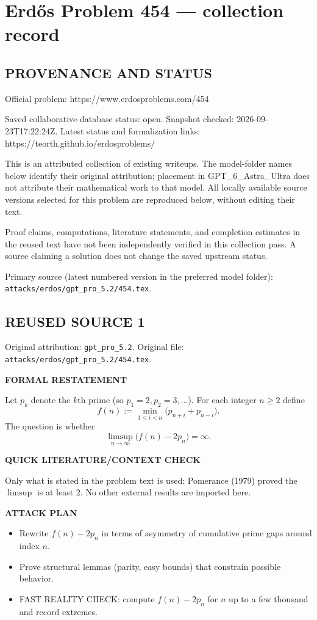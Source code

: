 \section*{Erd\H{o}s Problem 454 --- collection record}

\subsection*{PROVENANCE AND STATUS}
Official problem: https://www.erdosproblems.com/454

Saved collaborative-database status: open.
Snapshot checked: 2026-09-23T17:22:24Z.
Latest status and formalization links: https://teorth.github.io/erdosproblems/

This is an attributed collection of existing writeups. The model-folder names below identify their original attribution; placement in GPT\_6\_Astra\_Ultra does not attribute their mathematical work to that model. All locally available source versions selected for this problem are reproduced below, without editing their text.

Proof claims, computations, literature statements, and completion estimates in the reused text have not been independently verified in this collection pass. A source claiming a solution does not change the saved upstream status.

Primary source (latest numbered version in the preferred model folder): \texttt{attacks/erdos/gpt\_pro\_5.2/454.tex}.

\subsection*{REUSED SOURCE 1}
Original attribution: \texttt{gpt\_pro\_5.2}.
Original file: \texttt{attacks/erdos/gpt\_pro\_5.2/454.tex}.


\textbf{FORMAL RESTATEMENT}

Let $p_k$ denote the $k$th prime (so $p_1=2,p_2=3,\dots$). For each integer $n\ge 2$ define
\[
f(n):=\min_{1\le i<n}\big(p_{n+i}+p_{n-i}\big).
\]
The question is whether
\[
\limsup_{n\to\infty}\big(f(n)-2p_n\big)=\infty.
\]

\textbf{QUICK LITERATURE/CONTEXT CHECK}

Only what is stated in the problem text is used: Pomerance (1979) proved the $\limsup$ is at least $2$.
No other external results are imported here.

\textbf{ATTACK PLAN}

\begin{itemize}
\item Rewrite $f(n)-2p_n$ in terms of asymmetry of cumulative prime gaps around index $n$.
\item Prove structural lemmas (parity, easy bounds) that constrain possible behavior.
\item FAST REALITY CHECK: compute $f(n)-2p_n$ for $n$ up to a few thousand and record extremes.
\end{itemize}

